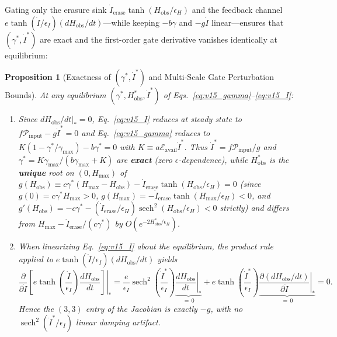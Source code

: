 \documentclass[11pt,a4paper]{article}
\newtheorem{proposition}[theorem]{Proposition}
\theoremstyle{remark}
\begin{document}
Gating only the erasure sink $\dot{I}_{\text{erase}}\tanh(H_{\text{obs}}/\epsilon_H)$ and the feedback channel $e\tanh(\dot{I}/\epsilon_I)\allowbreak(dH_{\text{obs}}/dt)$---while keeping $-b\gamma$ and $-g\dot{I}$ linear---ensures that $(\gamma^*, \dot{I}^*)$ are exact and the first-order gate derivative vanishes identically at equilibrium:

\begin{proposition}[Exactness of $(\gamma^*,\dot{I}^*)$ and Multi-Scale Gate Perturbation Bounds]
\label{prop:jacobian_invariance}
At any equilibrium $(\gamma^*, H_{\text{obs}}^*, \dot{I}^*)$ of Eqs.~\eqref{eq:v15_gamma}--\eqref{eq:v15_I}:
\begin{enumerate}
\setlength{\itemsep}{1pt}
    \item Since $\left.dH_{\text{obs}}/dt\right|_* = 0$, Eq.~\eqref{eq:v15_I} reduces at steady state to $f\mathcal{P}_{\text{input}} - g\dot{I}^* = 0$ and Eq.~\eqref{eq:v15_gamma} reduces to $K(1-\gamma^*/\gamma_{\max}) - b\gamma^* = 0$ with $K \equiv a\mathcal{E}_{\text{avail}}\dot{I}^*$. Thus $\dot{I}^* = f\mathcal{P}_{\text{input}}/g$ and $\gamma^* = K\gamma_{\max}/(b\gamma_{\max}+K)$ are \textbf{exact} (zero $\epsilon$-dependence), while $H_{\text{obs}}^*$ is the \textbf{unique} root on $(0, H_{\max})$ of $g(H_{\text{obs}}) \equiv c\gamma^*(H_{\max}-H_{\text{obs}}) - \dot{I}_{\text{erase}}\tanh(H_{\text{obs}}/\epsilon_H) = 0$ (since $g(0) = c\gamma^* H_{\max} > 0$, $g(H_{\max}) = -\dot{I}_{\text{erase}}\tanh(H_{\max}/\epsilon_H) < 0$, and $g'(H_{\text{obs}}) = -c\gamma^* - (\dot{I}_{\text{erase}}/\epsilon_H)\operatorname{sech}^2(H_{\text{obs}}/\epsilon_H) < 0$ strictly) and differs from $H_{\max} - \dot{I}_{\text{erase}}/(c\gamma^*)$ by $O(e^{-2H_{\text{obs}}^*/\epsilon_H})$.
    \item When linearizing Eq.~\eqref{eq:v15_I} about the equilibrium, the product rule applied to $e\tanh(\dot{I}/\epsilon_I)(dH_{\text{obs}}/dt)$ yields
    \begin{equation}
    \left.\frac{\partial}{\partial \dot{I}}\!\left[e\tanh\!\left(\frac{\dot{I}}{\epsilon_I}\right)\frac{dH_{\text{obs}}}{dt}\right]\right|_* = \frac{e}{\epsilon_I}\operatorname{sech}^2\!\left(\frac{\dot{I}^*}{\epsilon_I}\right)\underbrace{\left.\frac{dH_{\text{obs}}}{dt}\right|_*}_{=\,0} + e\tanh\!\left(\frac{\dot{I}^*}{\epsilon_I}\right)\underbrace{\left.\frac{\partial (dH_{\text{obs}}/dt)}{\partial \dot{I}}\right|_*}_{=\,0} = 0.
    \end{equation}
    Hence the $(3,3)$ entry of the Jacobian is exactly $-g$, with no $\operatorname{sech}^2(\dot{I}^*/\epsilon_I)$ linear damping artifact.

\end{enumerate}
\end{proposition}
\end{document}
